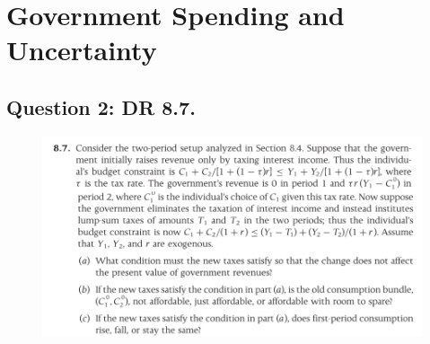 \documentclass{article}
\newcommand{\var}[1]{\mathrm{Var}\left(#1\right)}
\begin{document}
        
        
    
    \newpage
    \section{Government Spending and Uncertainty}
    
    \subsection{Question 2: DR 8.7.}
        
        \begin{figure}[!h]
            \centering
            \includegraphics[width=\textwidth]{./HW4-DR8.7.png}
        \end{figure}
        
\end{document}
